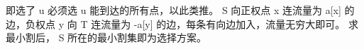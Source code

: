 {}
\markdownRendererSectionEnd \markdownRendererSectionBegin
{}\markdownRendererInterblockSeparator
{}即选了\markdownRendererDollarSign{} u \markdownRendererDollarSign{}必须选\markdownRendererDollarSign{} u \markdownRendererDollarSign{}能到达的所有点，以此类推。\markdownRendererParagraphSeparator
{}\markdownRendererDollarSign{} S \markdownRendererDollarSign{}向正权点\markdownRendererDollarSign{} x \markdownRendererDollarSign{}连流量为\markdownRendererDollarSign{} a[x] \markdownRendererDollarSign{}的边，负权点\markdownRendererDollarSign{} y \markdownRendererDollarSign{}向\markdownRendererDollarSign{} T \markdownRendererDollarSign{}连流量为\markdownRendererDollarSign{} -a[y] \markdownRendererDollarSign{}的边，每条有向边加入，流量无穷大即可。\markdownRendererParagraphSeparator
{}求最小割后，\markdownRendererDollarSign{} S \markdownRendererDollarSign{}所在的最小割集即为选择方案。\markdownRendererInterblockSeparator
{}
\markdownRendererSectionEnd \markdownRendererSectionBegin
{}\markdownRendererInterblockSeparator
